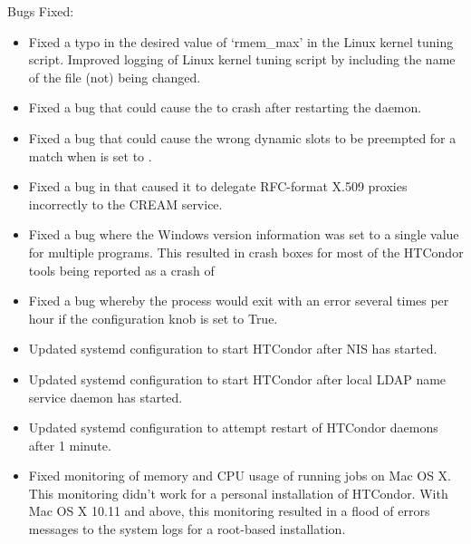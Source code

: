 \noindent Bugs Fixed:

\begin{itemize}

\item Fixed a typo in the desired value of `rmem\_max' in the Linux kernel
tuning script.  Improved logging of Linux kernel tuning script by including
the name of the file (not) being changed.

\item Fixed a bug that could cause the  to crash after
restarting the  daemon.

\item Fixed a bug that could cause the wrong dynamic slots to be preempted
for a match when  is set to .

\item Fixed a bug in  that caused it to delegate
RFC-format X.509 proxies incorrectly to the CREAM service.

\item Fixed a bug where the Windows version information was set to
a single value for multiple programs.
This resulted in crash boxes for most of the HTCondor tools being reported
as a crash of 

\item Fixed a bug whereby the  process would exit with
an error several times per hour if the configuration knob 
is set to True.

\item Updated systemd configuration to start HTCondor after NIS has started.

\item Updated systemd configuration to start HTCondor after local LDAP name
service daemon has started.

\item Updated systemd configuration to attempt restart of HTCondor daemons
after 1 minute.

\item Fixed monitoring of memory and CPU usage of running jobs on Mac OS X.
This monitoring didn't work for a personal installation of HTCondor.
With Mac OS X 10.11 and above, this monitoring resulted in a flood of
errors messages to the system logs for a root-based installation.


\end{itemize}
